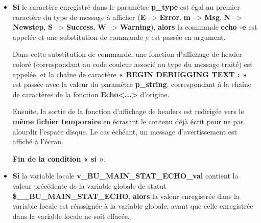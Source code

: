 \documentclass[a4paper,10pt]{article}
\begin{document}
\begin{itemize}
{\begin{itemize}
                \item
                {
                    \setlength{\parskip}{2em}

                    \begin{justify}
                        \textbf{\color{cond}Si} le caractère enregistré dans le paramètre \textbf{\color{vars}p\_type} est égal au premier caractère du type de message à afficher (\textbf{E} --> \textbf{Error}, \textbf{m} --> \textbf{Msg}, \textbf{N} --> \textbf{Newstep}, \textbf{S} --> \textbf{Success}, \textbf{W} --> \textbf{Warning}), \textbf{\color{cond}alors} la commande \textbf{\color{cmds}echo -e} est appelée et une substitution de commande y est passée en argument.
                    \end{justify}

                    \setlength{\parskip}{1em}

                    \begin{justify}
                        Dans cette substitution de commande, une fonction d'affichage de header coloré (correspondant au code couleur associé au type du message traité) est appelée, et la chaîne de caractère \textbf{« BEGIN DEBUGGING TEXT : »} est passée avec la valeur du paramètre \textbf{\color{vars}p\_string}, correspondant à la chaîne de caractères de la fonction \textbf{\color{func}Echo<...>} d'origine.
                    \end{justify}

                    \begin{justify}
                        Ensuite, la sortie de la fonction d'affichage de headers est redirigée vers le \textbf{\color{path}même fichier temporaire} en écrasant le contenu déjà écrit pour ne pas alourdir l'espace disque. Le cas échéant, un message d'avertissement est affiché à l'écran.
                    \end{justify}

                    \begin{justify}
                        \textbf{\color{cond}Fin de la condition « si »}.
                    \end{justify}
                }

                \item
                {
                    \setlength{\parskip}{2em}

                    \begin{justify}
                        \textbf{\color{cond}Si} la variable locale \textbf{\color{vars}v\_BU\_MAIN\_STAT\_ECHO\_val} contient la valeur précédente de la variable globale de statut \textbf{\color{vars}\$\_\_BU\_MAIN\_STAT\_ECHO}, \textbf{\color{cond}alors} la valeur enregistrée dans la variable locale est réassignée à la variable globale, avant que celle enregistrée dans la variable locale ne soit effacée.
                    \end{justify}\setlength{\parskip}{1em}

}
\end{itemize}}
\end{itemize}
\end{document}

